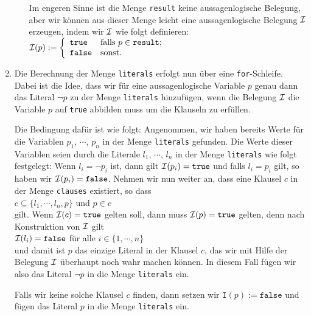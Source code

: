 \begin{enumerate}
\begin{enumerate}
            Im engeren Sinne ist die Menge \texttt{result} keine aussagenlogische Belegung, aber wir
            k\"{o}nnen aus dieser Menge leicht eine aussagenlogische Belegung $\mathcal{I}$ erzeugen, indem
            wir $\mathcal{I}$ wie folgt definieren: 
            \\[0.2cm]
            \hspace*{1.3cm}
            $\mathcal{I}(p) := \left\{
            \begin{array}{ll}
              \mathtt{true} & \mbox{falls $p \in \mathtt{result}$;}  \\
              \mathtt{false} & \mbox{sonst.}
            \end{array}
            \right.
            $
      \end{enumerate}
\item Die Berechnung der Menge \texttt{literals} erfolgt nun \"{u}ber eine \texttt{for}-Schleife.
      Dabei ist die Idee, dass wir f\"{u}r eine aussagenlogische Variable $p$ genau dann das Literal
      $\neg p$ zu der Menge \texttt{literals} hinzuf\"{u}gen, wenn die Belegung $\mathcal{I}$ die Variable $p$
      auf \texttt{true} abbilden muss um die Klauseln zu erf\"{u}llen.  

      Die Bedingung daf\"{u}r ist wie folgt: Angenommen, wir haben bereits Werte f\"{u}r die Variablen
      $p_1$, $\cdots$, $p_n$ in der Menge \texttt{literals}  gefunden.
      Die Werte dieser Variablen seien durch die Literale $l_1$, $\cdots$, $l_n$ in der Menge \texttt{literals}
      wie folgt festgelegt: Wenn $l_i = \neg p_i$ ist, dann gilt $\mathcal{I}(p_i) = \mathtt{true}$ 
      und falls $l_i = p_i$ gilt, so haben wir $\mathcal{I}(p_i) = \mathtt{false}$.
      Nehmen wir nun weiter an, dass eine Klausel $c$ in der Menge \texttt{clauses} existiert, so dass
      \\[0.2cm]
      \hspace*{1.3cm}
      $c \subseteq \{ l_1, \cdots, l_n, p \}$ \quad und \quad $p \in c$
      \\[0.2cm]
      gilt.  Wenn $\mathcal{I}(c) = \mathtt{true}$ gelten soll, dann muss $\mathcal{I}(p) = \mathtt{true}$ gelten, denn
      nach Konstruktion von $\mathcal{I}$ gilt 
      \\[0.2cm]
      \hspace*{1.3cm}
      $\mathcal{I}(l_i) = \mathtt{false}$ \quad f\"{u}r alle $i \in \{1,\cdots,n\}$
      \\[0.2cm]
      und damit ist $p$ das einzige Literal in der Klausel $c$, das wir mit Hilfe der Belegung $\mathcal{I}$
      \"{u}berhaupt noch wahr machen k\"{o}nnen.  In diesem Fall f\"{u}gen wir also das Literal
      $\neg p$ in die Menge \texttt{literals} ein. 

      Falls wir keine solche Klausel $c$ finden, dann setzen wir $\mathtt{I}(p) := \mathtt{false}$
      und f\"{u}gen das Literal $p$ in die Menge \texttt{literals} ein.
\end{enumerate}
